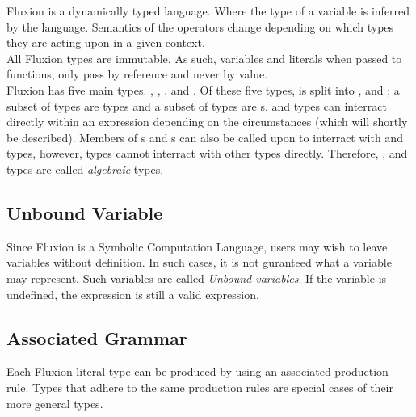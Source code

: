 \documentclass[11pt,a4paper]{book}
\begin{document}
Fluxion is a dynamically typed language. Where the type of a variable is inferred by the language. Semantics of the operators change depending on which types they are acting upon in a given context. \\

All Fluxion types are immutable. As such, variables and literals when passed to functions, only pass by reference and never by value.\\

Fluxion has five main types. , , ,  and . Of these five types,  is split into ,  and ; a subset of  types are  types and a subset of  types are s.   and  types can interract directly within an expression depending on the circumstances (which will shortly be described). Members of s and s can also be called upon to interract with  and  types, however,  types cannot interract with other types directly. Therefore, ,  and  types are called \textit{algebraic} types.

\subsection{Unbound Variable}

Since Fluxion is a Symbolic Computation Language, users may wish to leave variables without definition. In such cases, it is not guranteed what a variable may represent. Such variables are called \textit{Unbound variables}. If the variable  is undefined, the expression  is still a valid expression.

\subsection{Associated Grammar}

Each Fluxion literal type can be produced by using an associated production rule. Types that adhere to the same production rules are special cases of their more general types.
\end{document}
